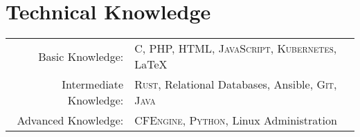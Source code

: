 \documentclass[letterpaper,10pt]{article}
\begin{document}
\pagestyle{plain}
\thispagestyle{fancy}




\section{Technical Knowledge}
\begin{tabular}{rl}
	Basic Knowledge:        & \textsc{C, PHP, HTML, JavaScript, Kubernetes}, \LaTeX            \\
	Intermediate Knowledge: & \textsc{Rust}, Relational Databases, Ansible, \textsc{Git, Java} \\
	Advanced Knowledge:     & \textsc{CFEngine, Python}, Linux Administration                  \\
\end{tabular}


\end{document}
